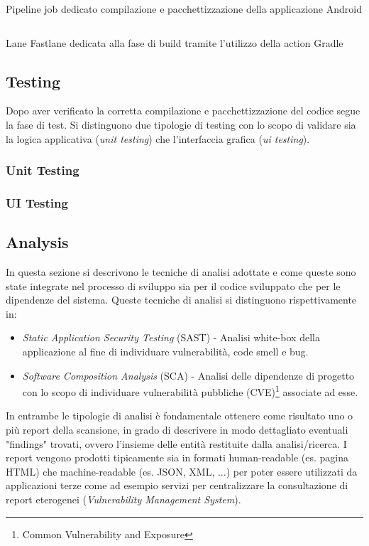 \begin{listing}[H]
\inputminted{yaml}{code/4-buildjob}
\caption{Pipeline job dedicato compilazione e pacchettizzazione della applicazione Android}
\end{listing}

\begin{listing}[H]
\inputminted{ruby}{code/4-buildft}
\caption{Lane Fastlane dedicata alla fase di build tramite l'utilizzo della action Gradle}
\end{listing}

\subsection{Testing}
Dopo aver verificato la corretta compilazione e pacchettizzazione del codice segue la fase di test. Si distinguono due tipologie di testing con lo scopo di validare sia la logica applicativa (\textit{unit testing}) che l'interfaccia grafica (\textit{ui testing}).
\subsubsection{Unit Testing}

\subsubsection{UI Testing}

\subsection{Analysis}
In questa sezione si descrivono le tecniche di analisi adottate e come queste sono state integrate nel processo di sviluppo sia per il codice sviluppato che per le dipendenze del sistema. Queste tecniche di analisi si distinguono rispettivamente in:
\begin{itemize}
    \item \textit{Static Application Security Testing} (SAST) - Analisi white-box della applicazione al fine di individuare vulnerabilità, code smell e bug.
    \item \textit{Software Composition Analysis} (SCA) - Analisi delle dipendenze di progetto con lo scopo di individuare vulnerabilità pubbliche (CVE)\footnote{Common Vulnerability and Exposure} associate ad esse.
\end{itemize}
In entrambe le tipologie di analisi è fondamentale ottenere come risultato uno o più report della scansione, in grado di descrivere in modo dettagliato eventuali "findings" trovati, ovvero l'insieme delle entità restituite dalla analisi/ricerca. I report vengono prodotti tipicamente sia in formati human-readable (es. pagina HTML) che machine-readable (es. JSON, XML, ...) per poter essere utilizzati da applicazioni terze come ad esempio servizi per centralizzare la consultazione di report eterogenei (\textit{Vulnerability Management System}).


